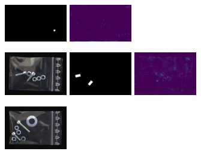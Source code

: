 \begin{figure}[H]
\begin{subfigure}[b]{\textwidth}
\begin{minipage}{0.45\textwidth}
            \includegraphics[width=0.3\textwidth]{figures/appendix/appendix_DRAEM/PP/s10m.png}
            \includegraphics[width=0.3\textwidth]{figures/appendix/appendix_DRAEM/PP/structural10_mask.png}
        \end{minipage}
    \end{subfigure}
    \hfill
    \begin{subfigure}[b]{\textwidth}
        \centering
        \begin{minipage}{0.45\textwidth}
            \centering
            \includegraphics[width=0.3\textwidth]{figures/appendix/appendix_DRAEM/SB/144.png}
            \includegraphics[width=0.3\textwidth]{figures/appendix/appendix_DRAEM/SB/144m.png}
            \includegraphics[width=0.3\textwidth]{figures/appendix/appendix_DRAEM/SB/144_mask.png}
        \end{minipage}
        \begin{minipage}{0.45\textwidth}
            \centering
            \includegraphics[width=0.3\textwidth]{figures/appendix/appendix_DRAEM/SB/337.png}

\end{minipage}
\end{subfigure}
\end{figure}
